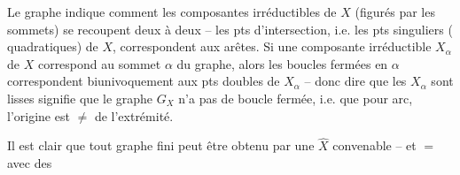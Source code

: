 Le graphe indique comment les composantes irréductibles de $X$ (figurés par les sommets) se recoupent deux à deux -- les pts d'intersection, i.e. les pts singuliers ( quadratiques) de $X$, correspondent aux arêtes. Si une composante irréductible $X_\alpha$ de $X$ correspond au sommet $\alpha$ du graphe, alors les boucles fermées en $\alpha$ correspondent biunivoquement aux pts doubles de $X_\alpha$ -- donc dire que les $X_\alpha$ sont lisses signifie que le graphe $G_X$ n'a pas de boucle fermée, i.e. que pour  arc, l'origine est $\neq$ de l'extrémité.

Il est clair que tout graphe fini peut être obtenu   par une $\widehat X$ convenable -- et $=$ avec des 
